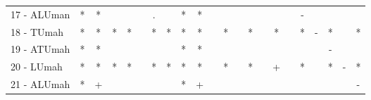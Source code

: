 \begin{table}[h]
\begin{center}
\begin{tabular}{lcc|cc|cc|cc|cc|cc|cc|cc|cc|cc|c}
17 - ALUman	& * & * &   &   &   & . &   & * & * &   &   &   &   &   &   &   & - &   &   &   &   \\
18 - TUmah	& * & * & * & * &   & * & * & * & * &   & * &   & * &   & * &   & * & - & * &   & * \\ \hline
19 - ATUmah	& * & * &   &   &   &   &   & * & * &   &   &   &   &   &   &   &   &   & - &   &   \\
20 - LUmah	& * & * & * & * &   & * & * & * & * &   & * &   & * &   & + &   & * &   & * & - & * \\ \hline
21 - ALUmah	& * & + &   &   &   &   &   & * & + &   &   &   &   &   &   &   &   &   &   &   & - \\\end{tabular}
\label{stratsALCKappaFriedCIELM}
\end{center}
\end{table}